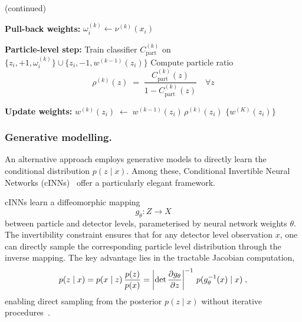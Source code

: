 \begin{algorithm}\ContinuedFloat
  \caption[]{(continued)} %
  \begin{algorithmic}[1]
    
    \State \textbf{Pull-back weights:}
      \State $\omega_i^{(k)} \leftarrow \nu^{(k)}(x_i)$
    \EndFor
    
    \State \textbf{Particle-level step:}
    \State Train classifier $C_{\text{part}}^{(k)}$ on
      $\{z_i,+1,\omega_i^{(k)}\}\cup\{z_i,-1,w^{(k-1)}(z_i)\}$
    \State Compute particle ratio
      \[
        \rho^{(k)}(z)\;=\;\frac{C_{\text{part}}^{(k)}(z)}{1 - C_{\text{part}}^{(k)}(z)}
        \quad\forall z
      \]
    
    \State \textbf{Update weights:}
      \State $w^{(k)}(z_i)\;\leftarrow\;w^{(k-1)}(z_i)\,\rho^{(k)}(z_i)$
    \EndFor
  \EndFor
  \State \Return $\{w^{(K)}(z_i)\}$
  \end{algorithmic}
\end{algorithm}
        \subsubsection{Generative modelling.}
            An alternative approach employs generative models to directly learn the conditional distribution \(p(z \mid x)\).
            Among these, Conditional Invertible Neural Networks (cINNs)~\cite{AnanthaPadmanabha2021SolvingNetworks} offer a particularly elegant framework.
            
            cINNs learn a diffeomorphic mapping \[g_\theta: {Z} \to {X}\] between particle and detector levels, parameterised by neural network weights \(\theta\).
            The invertibility constraint ensures that for any detector level observation \(x\), one can directly sample the corresponding particle level distribution through the inverse mapping.
            The key advantage lies in the tractable Jacobian computation,
            \begin{equation}
                p(z\mid x) = p(x\mid z) \,\frac{p(z)}{p(x)} = \left|\det \pdv{g_\theta}{z} \right|^{-1}\, p(g_\theta^{-1}(x) \mid x)\;,
            \end{equation}
            enabling direct sampling from the posterior \(p(z \mid x)\) without iterative procedures~\cite{Bellagente2020InvertibleAgain}.

